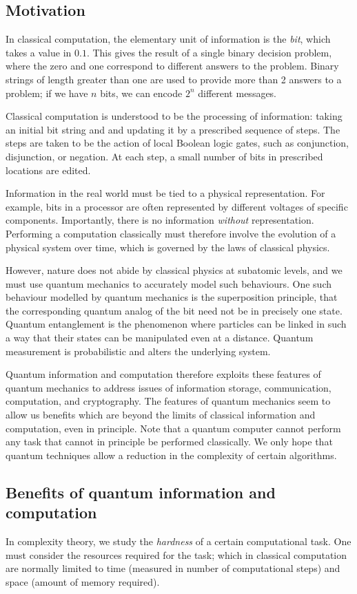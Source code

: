 \subsection{Motivation}
In classical computation, the elementary unit of information is the \emph{bit}, which takes a value in \( \qty{0,1} \).
This gives the result of a single binary decision problem, where the zero and one correspond to different answers to the problem.
Binary strings of length greater than one are used to provide more than 2 answers to a problem; if we have \( n \) bits, we can encode \( 2^n \) different messages.

Classical computation is understood to be the processing of information: taking an initial bit string and and updating it by a prescribed sequence of steps.
The steps are taken to be the action of local Boolean logic gates, such as conjunction, disjunction, or negation.
At each step, a small number of bits in prescribed locations are edited.

Information in the real world must be tied to a physical representation.
For example, bits in a processor are often represented by different voltages of specific components.
Importantly, there is no information \emph{without} representation.
Performing a computation classically must therefore involve the evolution of a physical system over time, which is governed by the laws of classical physics.

However, nature does not abide by classical physics at subatomic levels, and we must use quantum mechanics to accurately model such behaviours.
One such behaviour modelled by quantum mechanics is the superposition principle, that the corresponding quantum analog of the bit need not be in precisely one state.
Quantum entanglement is the phenomenon where particles can be linked in such a way that their states can be manipulated even at a distance.
Quantum measurement is probabilistic and alters the underlying system.

Quantum information and computation therefore exploits these features of quantum mechanics to address issues of information storage, communication, computation, and cryptography.
The features of quantum mechanics seem to allow us benefits which are beyond the limits of classical information and computation, even in principle.
Note that a quantum computer cannot perform any task that cannot in principle be performed classically.
We only hope that quantum techniques allow a reduction in the complexity of certain algorithms.

\subsection{Benefits of quantum information and computation}
In complexity theory, we study the \emph{hardness} of a certain computational task.
One must consider the resources required for the task; which in classical computation are normally limited to time (measured in number of computational steps) and space (amount of memory required).

